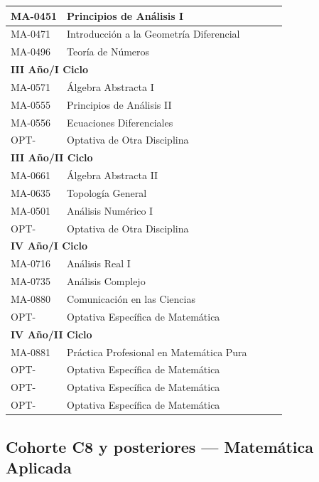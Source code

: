 \begin{longtable}{|p{2cm}|p{7cm}|p{1.6cm}|p{1.6cm}|p{2.8cm}|}
MA-0451 & Principios de Análisis I &  &  &  \\ \hline
MA-0471 & Introducción a la Geometría Diferencial &  &  &  \\ \hline
MA-0496 & Teoría de Números &  &  &  \\ \hline
\multicolumn{5}{|l|}{\cellcolor[HTML]{E6E6E6}\textbf{III Año/I Ciclo}} \\ \hline
MA-0571 & Álgebra Abstracta I &  &  &  \\ \hline
MA-0555 & Principios de Análisis II &  &  &  \\ \hline
MA-0556 & Ecuaciones Diferenciales &  &  &  \\ \hline
OPT- & Optativa de Otra Disciplina &  &  &  \\ \hline
\multicolumn{5}{|l|}{\cellcolor[HTML]{E6E6E6}\textbf{III Año/II Ciclo}} \\ \hline
MA-0661 & Álgebra Abstracta II &  &  &  \\ \hline
MA-0635 & Topología General &  &  &  \\ \hline
MA-0501 & Análisis Numérico I &  &  &  \\ \hline
OPT- & Optativa de Otra Disciplina &  &  &  \\ \hline
\multicolumn{5}{|l|}{\cellcolor[HTML]{E6E6E6}\textbf{IV Año/I Ciclo}} \\ \hline
MA-0716 & Análisis Real I &  &  &  \\ \hline
MA-0735 & Análisis Complejo &  &  &  \\ \hline
MA-0880 & Comunicación en las Ciencias &  &  &  \\ \hline
OPT- & Optativa Específica de Matemática &  &  &  \\ \hline
\multicolumn{5}{|l|}{\cellcolor[HTML]{E6E6E6}\textbf{IV Año/II Ciclo}} \\ \hline
MA-0881 & Práctica Profesional en Matemática Pura &  &  &  \\ \hline
OPT- & Optativa Específica de Matemática &  &  &  \\ \hline
OPT- & Optativa Específica de Matemática &  &  &  \\ \hline
OPT- & Optativa Específica de Matemática &  &  &  \\ \hline
\end{longtable}

\subsection{Cohorte C8 y posteriores --- Matemática Aplicada}
\label{anexo:estudioC8A}

